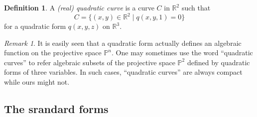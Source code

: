 \documentclass[pdftex,a4paper,12pt]{scrartcl}
\theoremstyle{plain}
\theoremstyle{definition}
\newtheorem*{definition}{Definition}
\theoremstyle{remark}
\newtheorem{remark}[theorem]{Remark}
\begin{document}
\begin{definition}
A \emph{(real) quadratic curve} is a curve $C$ in $\mathbb R^2$ such that
\[
C=\{(x,y)\in\mathbb R^2\mid q(x,y,1)=0\}
\]
for a quadratic form $q(x,y,z)$ on $\mathbb R^3$.
\end{definition}

\begin{remark}
It is easily seen that a quadratic form actually defines an algebraic function on the projective space $\mathbb P^n$.
One may sometimes use the word ``quadratic curves'' to refer algebraic subsets of the projective space $\mathbb P^2$ defined by quadratic forms of three variables.
In such cases, ``quadratic curves'' are always compact while ours might not.
\end{remark}

\subsection{The srandard forms}
\end{document}
